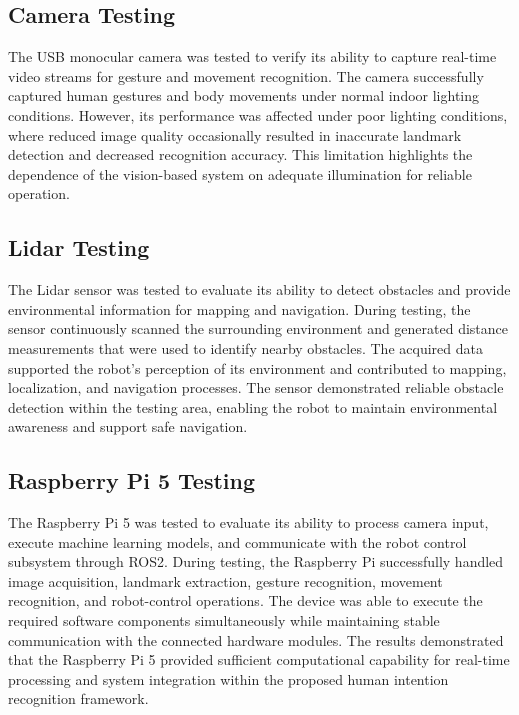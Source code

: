 \subsection{Camera Testing}

The USB monocular camera was tested to verify its ability to capture real-time video streams for gesture and movement recognition. The camera successfully captured human gestures and body movements under normal indoor lighting conditions. However, its performance was affected under poor lighting conditions, where reduced image quality occasionally resulted in inaccurate landmark detection and decreased recognition accuracy. This limitation highlights the dependence of the vision-based system on adequate illumination for reliable operation.

\subsection{Lidar Testing}

The Lidar sensor was tested to evaluate its ability to detect obstacles and provide environmental information for mapping and navigation. During testing, the sensor continuously scanned the surrounding environment and generated distance measurements that were used to identify nearby obstacles. The acquired data supported the robot's perception of its environment and contributed to mapping, localization, and navigation processes. The sensor demonstrated reliable obstacle detection within the testing area, enabling the robot to maintain environmental awareness and support safe navigation.

\subsection{Raspberry Pi 5 Testing}

The Raspberry Pi 5 was tested to evaluate its ability to process camera input, execute machine learning models, and communicate with the robot control subsystem through ROS2. During testing, the Raspberry Pi successfully handled image acquisition, landmark extraction, gesture recognition, movement recognition, and robot-control operations. The device was able to execute the required software components simultaneously while maintaining stable communication with the connected hardware modules. The results demonstrated that the Raspberry Pi 5 provided sufficient computational capability for real-time processing and system integration within the proposed human intention recognition framework.

